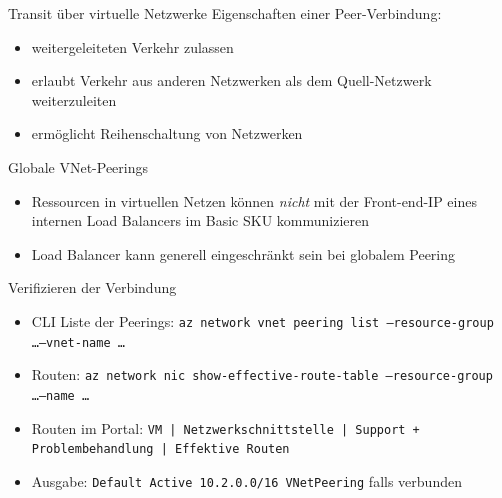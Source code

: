 
\begin{flashcard}[Definition]{Transit über virtuelle Netzwerke}
    Eigenschaften einer Peer-Verbindung:
    \begin{itemize}
        \item weitergeleiteten Verkehr zulassen
        \item[$\Rightarrow$] erlaubt Verkehr aus anderen Netzwerken als dem Quell-Netzwerk weiterzuleiten
        \item ermöglicht Reihenschaltung von Netzwerken
    \end{itemize}
\end{flashcard}

\begin{flashcard}[Definition]{Globale VNet-Peerings}
    \begin{itemize}
        \item Ressourcen in virtuellen Netzen können \emph{nicht} mit der Front-end-IP eines internen Load Balancers im Basic SKU kommunizieren
        \item Load Balancer kann generell eingeschränkt sein bei globalem Peering
    \end{itemize}
\end{flashcard}


\begin{flashcard}[Definition]{Verifizieren der Verbindung}
    \begin{itemize}
        \item CLI Liste der Peerings:\newline
            \texttt{az network vnet peering list --resource-group \ldots --vnet-name \ldots}
        \item Routen:\newline
            \texttt{az network nic show-effective-route-table --resource-group \ldots --name \ldots}
        \item Routen im Portal:\newline
            \texttt{VM | Netzwerkschnittstelle | Support + Problembehandlung | Effektive Routen}
        \item Ausgabe:
            \texttt{Default   Active   10.2.0.0/16       VNetPeering} falls verbunden
    \end{itemize}
\end{flashcard}

